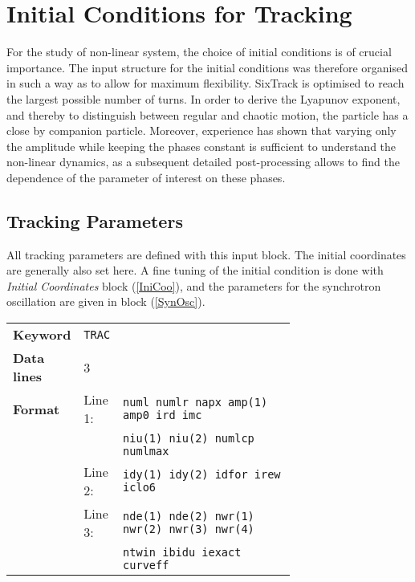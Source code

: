 
\chapter{Initial Conditions for Tracking} \label{InitCondTrack}

For the study of non-linear system, the choice of initial conditions is of crucial importance.
The input structure for the initial conditions was therefore organised in such a way as to allow for maximum flexibility.
SixTrack is optimised to reach the largest possible number of turns.
In order to derive the Lyapunov exponent, and thereby to distinguish between regular and chaotic motion, the particle has a close by companion particle.
Moreover, experience has shown that varying only the amplitude while keeping the phases constant is sufficient to understand the non-linear dynamics, as a subsequent detailed post-processing allows to find the dependence of the parameter of interest on these phases.

\section{Tracking Parameters} \label{TraPar}

All tracking parameters are defined with this input block.
The initial coordinates are generally also set here.
A fine tuning of the initial condition is done with \textit{Initial Coordinates} block (\ref{IniCoo}), and the parameters for the synchrotron oscillation are given in block (\ref{SynOsc}).

\bigskip
\begin{tabular}{@{}llp{0.7\linewidth}}
    \textbf{Keyword}    & \texttt{TRAC}\index{TRAC} &\\
    \textbf{Data lines} & 3 &\\
    \textbf{Format}     & Line 1: & \texttt{numl numlr napx amp(1) amp0 ird imc} \\
                        &         & \texttt{niu(1) niu(2) numlcp numlmax} \\
                        & Line 2: & \texttt{idy(1) idy(2) idfor irew iclo6} \\
                        & Line 3: & \texttt{nde(1) nde(2) nwr(1) nwr(2) nwr(3) nwr(4)} \\
                        &         & \texttt{ntwin ibidu iexact curveff}
\end{tabular}

